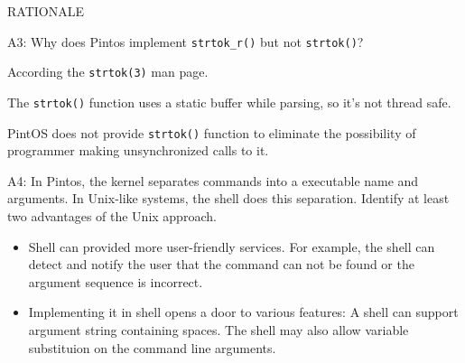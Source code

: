\begin{aspect}{RATIONALE}
	\begin{qc}
		A3: Why does Pintos implement \lstinline{strtok_r()} but not \lstinline{strtok()}?
	\end{qc}
	According the \lstinline{strtok(3)} man page.
	\begin{tcolorbox}
		\textbullet The \lstinline{strtok()} function uses a static buffer while parsing, so it's not thread safe.
	\end{tcolorbox}
	PintOS does not provide \lstinline{strtok()} function to eliminate the possibility of programmer making unsynchronized calls to it.

	\begin{qc}
		A4: In Pintos, the kernel separates commands into a executable name and arguments.
		In Unix-like systems, the shell does this separation.
		Identify at least two advantages of the Unix approach.
	\end{qc}
	\begin{itemize}
		\item Shell can provided more user-friendly services.
		      For example, the shell can detect and notify the user that the command can not be found or the argument sequence is incorrect.
		\item Implementing it in shell opens a door to various features: A shell can support argument string containing spaces.
		      The shell may also allow variable substituion on the command line arguments.
	\end{itemize}
\end{aspect}
